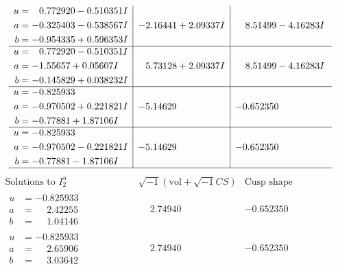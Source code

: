 \documentclass[1p]{elsarticle_modified}
\theoremstyle{definition}
\newcommand{\I}{\sqrt{-1}}
\begin{document}
$$\begin{array}{c|c|c}
\begin{aligned}
u &= \phantom{-}0.772920 - 0.510351 I \\
a &= -0.325403 - 0.538567 I \\
b &= -0.954335 + 0.596353 I\end{aligned}
 & -2.16441 + 2.09337 I & \phantom{-}8.51499 - 4.16283 I \\ \hline\begin{aligned}
u &= \phantom{-}0.772920 - 0.510351 I \\
a &= -1.55657 + 0.05607 I \\
b &= -0.145829 + 0.038232 I\end{aligned}
 & \phantom{-}5.73128 + 2.09337 I & \phantom{-}8.51499 - 4.16283 I \\ \hline\begin{aligned}
u &= -0.825933\phantom{ +0.000000I} \\
a &= -0.970502 + 0.221821 I \\
b &= -0.77881 + 1.87106 I\end{aligned}
 & -5.14629\phantom{ +0.000000I} & -0.652350\phantom{ +0.000000I} \\ \hline\begin{aligned}
u &= -0.825933\phantom{ +0.000000I} \\
a &= -0.970502 - 0.221821 I \\
b &= -0.77881 - 1.87106 I\end{aligned}
 & -5.14629\phantom{ +0.000000I} & -0.652350\phantom{ +0.000000I}\\
 \hline 
 \end{array}$$\newpage$$\begin{array}{c|c|c}  
\text{Solutions to }I^u_{2}& \I (\text{vol} + \sqrt{-1}CS) & \text{Cusp shape}\\
 \hline 
\begin{aligned}
u &= -0.825933\phantom{ +0.000000I} \\
a &= \phantom{-}2.42255\phantom{ +0.000000I} \\
b &= \phantom{-}1.04146\phantom{ +0.000000I}\end{aligned}
 & \phantom{-}2.74940\phantom{ +0.000000I} & -0.652350\phantom{ +0.000000I} \\ \hline\begin{aligned}
u &= -0.825933\phantom{ +0.000000I} \\
a &= \phantom{-}2.65906\phantom{ +0.000000I} \\
b &= \phantom{-}3.03642\phantom{ +0.000000I}\end{aligned}
 & \phantom{-}2.74940\phantom{ +0.000000I} & -0.652350\phantom{ +0.000000I} \\ \hline\begin{aligned}

\end{aligned}
\end{array}$$
\end{document}
